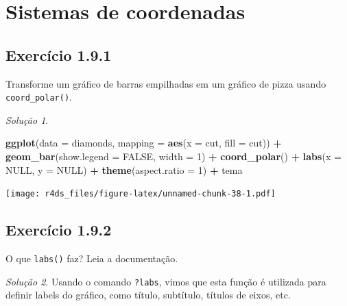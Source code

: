 \documentclass[
]{latex/krantz}
\newenvironment{Shaded}{\begin{snugshade}}{\end{snugshade}}
\newcommand{\AttributeTok}[1]{\textcolor[rgb]{0.13,0.29,0.53}{#1}}
\newcommand{\ConstantTok}[1]{\textcolor[rgb]{0.56,0.35,0.01}{#1}}
\newcommand{\DecValTok}[1]{\textcolor[rgb]{0.00,0.00,0.81}{#1}}
\newcommand{\FunctionTok}[1]{\textcolor[rgb]{0.13,0.29,0.53}{\textbf{#1}}}
\newcommand{\NormalTok}[1]{#1}
\newcommand{\SpecialCharTok}[1]{\textcolor[rgb]{0.81,0.36,0.00}{\textbf{#1}}}
\theoremstyle{definition}
\theoremstyle{definition}
\theoremstyle{definition}
\theoremstyle{definition}
\theoremstyle{remark}
\newtheorem*{solution}{Solução}
\begin{document}
\hypertarget{sistemas-de-coordenadas}{%
\section{Sistemas de coordenadas}\label{sistemas-de-coordenadas}}

\hypertarget{exr1-9-1}{%
\subsection*{Exercício 1.9.1}\label{exr1-9-1}}

Transforme um gráfico de barras empilhadas em um gráfico de pizza usando \texttt{coord\_polar()}.

\begin{solution}
\leavevmode

\begin{Shaded}
\begin{Highlighting}[]
\FunctionTok{ggplot}\NormalTok{(}\AttributeTok{data =}\NormalTok{ diamonds, }\AttributeTok{mapping =} \FunctionTok{aes}\NormalTok{(}\AttributeTok{x =}\NormalTok{ cut, }\AttributeTok{fill =}\NormalTok{ cut)) }\SpecialCharTok{+}
    \FunctionTok{geom\_bar}\NormalTok{(}\AttributeTok{show.legend =} \ConstantTok{FALSE}\NormalTok{, }\AttributeTok{width =} \DecValTok{1}\NormalTok{) }\SpecialCharTok{+}
    \FunctionTok{coord\_polar}\NormalTok{() }\SpecialCharTok{+}
    \FunctionTok{labs}\NormalTok{(}\AttributeTok{x =} \ConstantTok{NULL}\NormalTok{, }\AttributeTok{y =} \ConstantTok{NULL}\NormalTok{) }\SpecialCharTok{+}
    \FunctionTok{theme}\NormalTok{(}\AttributeTok{aspect.ratio =} \DecValTok{1}\NormalTok{) }\SpecialCharTok{+}
\NormalTok{    tema}
\end{Highlighting}
\end{Shaded}

\texttt{[image: r4ds\_files/figure-latex/unnamed-chunk-38-1.pdf]}

\end{solution}

\hypertarget{exr1-9-2}{%
\subsection*{Exercício 1.9.2}\label{exr1-9-2}}

O que \texttt{labs()} faz? Leia a documentação.

\begin{solution}
Usando o comando \texttt{?labs}, vimos que esta função é utilizada para definir labels do gráfico, como título, subtítulo, títulos de eixos, etc.
\end{solution}
\end{document}
